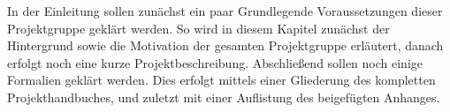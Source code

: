 

In der Einleitung sollen zunächst ein paar Grundlegende Voraussetzungen dieser Projektgruppe geklärt werden. So wird in diesem Kapitel zunächst der Hintergrund sowie die Motivation der gesamten Projektgruppe erläutert, danach erfolgt noch eine kurze Projektbeschreibung. Abschließend sollen noch einige Formalien geklärt werden. Dies erfolgt mittels einer Gliederung des kompletten Projekthandbuches, und zuletzt mit einer Auflistung des beigefügten Anhanges.







